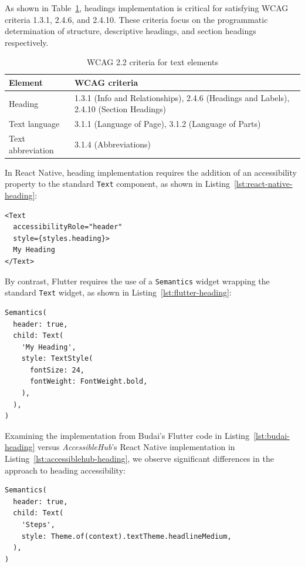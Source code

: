 As shown in Table~\ref{tab:wcag_criteria}, headings implementation is critical for satisfying WCAG criteria 1.3.1, 2.4.6, and 2.4.10. These criteria focus on the programmatic determination of structure, descriptive headings, and section headings respectively.

\begin{table}[ht]
\caption{WCAG 2.2 criteria for text elements}
\label{tab:wcag_criteria}
\centering
\begin{tabular}{|p{2.5cm}|p{9cm}|}
\hline
\textbf{Element} & \textbf{WCAG criteria} \\
\hline
Heading & 1.3.1 (Info and Relationships), 2.4.6 (Headings and Labels), 2.4.10 (Section Headings) \\
\hline
Text language & 3.1.1 (Language of Page), 3.1.2 (Language of Parts) \\
\hline
Text abbreviation & 3.1.4 (Abbreviations) \\
\hline
\end{tabular}
\end{table}

In React Native, heading implementation requires the addition of an accessibility property to the standard \texttt{Text} component, as shown in Listing~\ref{lst:react-native-heading}:

\begin{lstlisting}[style=ReactNativeStyle, caption=Heading implementation in React Native, label=lst:react-native-heading]
<Text
  accessibilityRole="header"
  style={styles.heading}>
  My Heading
</Text>
\end{lstlisting}

By contrast, Flutter requires the use of a \texttt{Semantics} widget wrapping the standard \texttt{Text} widget, as shown in Listing~\ref{lst:flutter-heading}:

\begin{lstlisting}[style=DartStyle, caption=Heading implementation in Flutter, label=lst:flutter-heading]
Semantics(
  header: true,
  child: Text(
    'My Heading',
    style: TextStyle(
      fontSize: 24,
      fontWeight: FontWeight.bold,
    ),
  ),
)
\end{lstlisting}

Examining the implementation from Budai's Flutter code in Listing~\ref{lst:budai-heading} versus \textit{AccessibleHub}'s React Native implementation in Listing~\ref{lst:accessiblehub-heading}, we observe significant differences in the approach to heading accessibility:

\begin{lstlisting}[style=DartStyle, caption=Budai's Flutter implementation of headers, label=lst:budai-heading]
Semantics(
  header: true,
  child: Text(
    'Steps',
    style: Theme.of(context).textTheme.headlineMedium,
  ),
)
\end{lstlisting}

